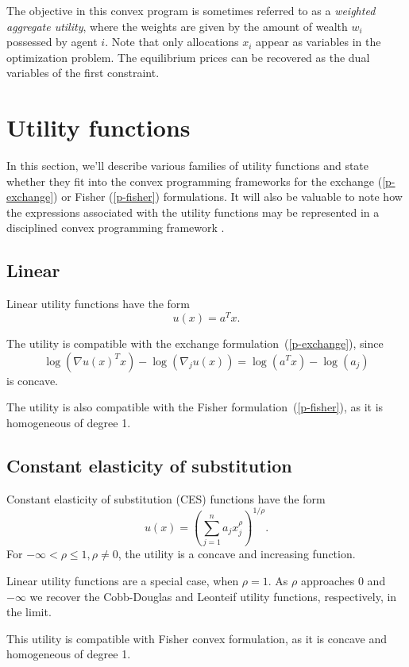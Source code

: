 \documentclass[12pt]{article}
\begin{document}
The objective in this convex program is sometimes referred to as a
\emph{weighted aggregate utility}, where the weights are given by the amount of
wealth $w_i$ possessed by agent $i$. Note that only allocations $x_i$ appear as
variables in the optimization problem. The equilibrium prices can be recovered
as the dual variables of the first constraint.

\section{Utility functions}
\label{sec:util_funcs}

In this section, we'll describe various families of utility functions
and state whether they fit into the convex programming frameworks
for the exchange (\ref{p-exchange}) or Fisher (\ref{p-fisher}) formulations.
It will also
be valuable to note how the expressions associated
with the utility functions may be represented in a disciplined
convex programming framework \cite{GBY:06,Grant2004,cvx,cvxpy}.


\subsection{Linear}

Linear utility functions have the form
\[
u(x) = a^T x.
\]

The utility is compatible with the exchange formulation~(\ref{p-exchange}),
since
\[
\log(\nabla u(x)^T x) - \log(\nabla_j u(x))  = \log(a^T x) - \log(a_j)
\]
is concave.

The utility is also compatible with the Fisher formulation~(\ref{p-fisher}), as it is
homogeneous of degree 1.


\subsection{Constant elasticity of substitution}
Constant elasticity of substitution (CES) functions have the form
\[
u(x) = \left(\sum_{j=1}^n a_j x_j^\rho \right)^{1/\rho}.
\]
For $-\infty < \rho \leq 1, \rho \neq 0$, the utility is a concave and
increasing function.

Linear utility functions are a special case, when $\rho = 1$.
As $\rho$ approaches $0$ and $-\infty$ we recover the Cobb-Douglas and Leonteif
utility functions, respectively, in the limit.

This utility is compatible with Fisher convex formulation, as it is concave and
homogeneous of degree 1.
\end{document}
